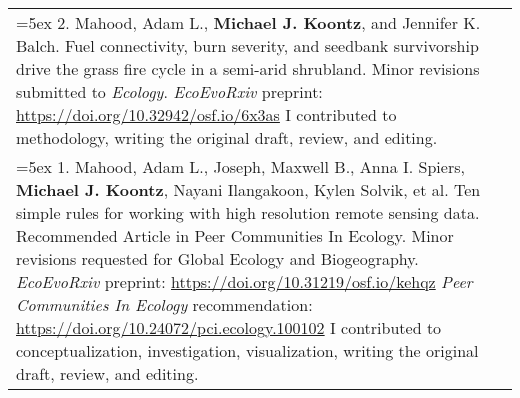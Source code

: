 \begin{longtable}{@{} >{\raggedright}p{6.10in} >{\raggedleft}X @{}}

\hangindent=5ex 2. Mahood, Adam L., \textbf{Michael J. Koontz}, and Jennifer K. Balch. Fuel connectivity, burn severity, and seedbank survivorship drive the grass fire cycle in a semi-arid shrubland. Minor revisions submitted to \emph{Ecology}. 
\newline \emph{EcoEvoRxiv} preprint: \href{https://doi.org/10.32942/osf.io/6x3as}{https://doi.org/10.32942/osf.io/6x3as}  
\newline I contributed to methodology, writing the original draft, review, and editing. & \tabularnewline

\hangindent=5ex 1. Mahood, Adam L., Joseph, Maxwell B., Anna I. Spiers, \textbf{Michael J. Koontz}, Nayani Ilangakoon, Kylen Solvik, et al. Ten simple rules for working with high resolution remote sensing data. Recommended Article in Peer Communities In Ecology. Minor revisions requested for Global Ecology and Biogeography.
\newline \emph{EcoEvoRxiv} preprint: \href{https://doi.org/10.31219/osf.io/kehqz}{https://doi.org/10.31219/osf.io/kehqz} 
\newline \emph{Peer Communities In Ecology} recommendation: \href{https://doi.org/10.24072/pci.ecology.100102}{https://doi.org/10.24072/pci.ecology.100102}   
\newline I contributed to conceptualization, investigation, visualization, writing the original draft, review, and editing. & \tabularnewline

\end{longtable}
